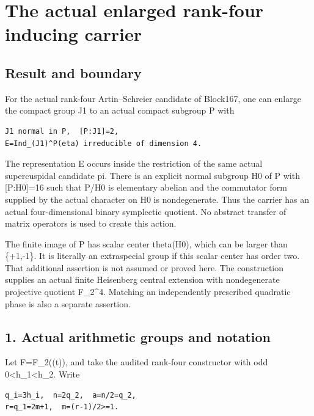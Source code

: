 \clearpage
\section{The actual enlarged rank-four inducing carrier}\label{app:rank4}


\hypertarget{rank4-result-and-boundary}{%
\subsection{Result and boundary}\label{rank4-result-and-boundary}}

For the actual rank-four Artin--Schreier candidate of Block167, one can
enlarge the compact group J1 to an actual compact subgroup P with

\begin{Verbatim}[fontsize=\small,breaklines=true,breakanywhere=true]
J1 normal in P,  [P:J1]=2,
E=Ind_(J1)^P(eta) irreducible of dimension 4.
\end{Verbatim}

The representation E occurs inside the restriction of the same actual
supercuspidal candidate pi. There is an explicit normal subgroup H0 of P
with {[}P:H0{]}=16 such that P/H0 is elementary abelian and the
commutator form supplied by the actual character on H0 is nondegenerate.
Thus the carrier has an actual four-dimensional binary symplectic
quotient. No abstract transfer of matrix operators is used to create
this action.

The finite image of P has scalar center theta(H0), which can be larger
than \{+1,-1\}. It is literally an extraspecial group if this scalar
center has order two. That additional assertion is not assumed or proved
here. The construction supplies an actual finite Heisenberg central
extension with nondegenerate projective quotient F\_2\^{}4. Matching an
independently prescribed quadratic phase is also a separate assertion.

\hypertarget{rank4-actual-arithmetic-groups-and-notation}{%
\subsection{1. Actual arithmetic groups and
notation}\label{rank4-actual-arithmetic-groups-and-notation}}

Let F=F\_2((t)), and take the audited rank-four constructor with odd
0\textless h\_1\textless h\_2. Write

\begin{Verbatim}[fontsize=\small,breaklines=true,breakanywhere=true]
q_i=3h_i,  n=2q_2,  a=n/2=q_2,
r=q_1=2m+1,  m=(r-1)/2>=1.
\end{Verbatim}


